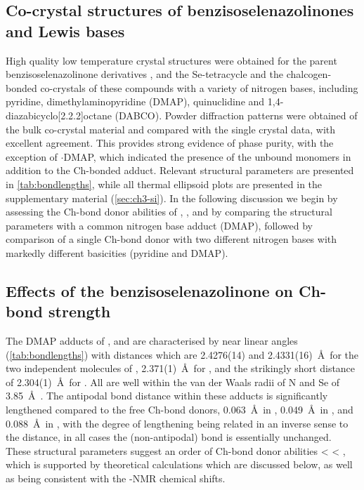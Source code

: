 \begin{refsection}
    \subsection{Co-crystal structures of benzisoselenazolinones and Lewis bases}
    High quality low temperature crystal structures were obtained for the parent benzisoselenazolinone derivatives  \autocite{Thomas2015},  and the Se-tetracycle  and the chalcogen-bonded co-crystals of these compounds with a variety of nitrogen bases, including pyridine, dimethylaminopyridine (DMAP), quinuclidine and 1,4-diaza\-bicyclo[2.2.2]\-oct\-ane (DABCO).
    Powder diffraction patterns were obtained of the bulk co-crystal material and compared with the single crystal data, with excellent agreement.
    This provides strong evidence of phase purity, with the exception of $ \cdot $DMAP, which indicated the presence of the unbound monomers in addition to the Ch-bonded adduct.
    Relevant structural parameters are presented in \cref{tab:bondlengths}, while all thermal ellipsoid plots are presented in the supplementary material (\cref{sec:ch3-si}).
    In the following discussion we begin by assessing the Ch-bond donor abilities of , , and  by comparing the structural parameters with a common nitrogen base adduct (DMAP), followed by comparison of a single Ch-bond donor  with two different nitrogen bases with markedly different basicities (pyridine and DMAP).
    
    \subsection{Effects of the benzisoselenazolinone on Ch-bond strength}
    The DMAP adducts of ,  and  are characterised by near linear  angles (\cref{tab:bondlengths}) with  distances which are 2.4276(14) and 2.4331(16)~\AA\ for the two independent molecules of , 2.371(1)~\AA\ for , and the strikingly short  distance of 2.304(1)~\AA\ for .
    All are well within the van der Waals radii of N and Se of 3.85~\AA\ \autocite{Batsanov2001}.
    The antipodal  bond distance within these adducts is significantly lengthened compared to the free Ch-bond donors, 0.063~\AA\ in , 0.049~\AA\ in , and 0.088~\AA\ in , with the degree of lengthening being related in an inverse sense to the  distance, in all cases the (non-antipodal)  bond is essentially unchanged.
    These structural parameters suggest an order of Ch-bond donor abilities  <  < , which is supported by theoretical calculations which are discussed below, as well as being consistent with the -NMR chemical shifts.
    

\end{refsection}
